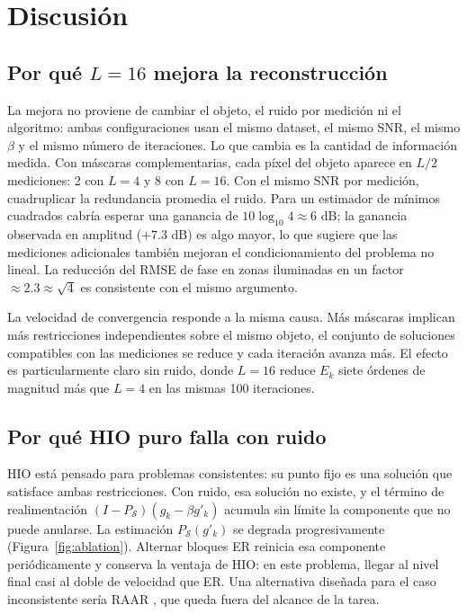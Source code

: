 \documentclass[11pt,a4paper]{article}
\newcommand{\hio}{\textsc{HIO}}
\newcommand{\er}{\textsc{ER}}
\begin{document}
\section{Discusión}

\subsection{Por qué \texorpdfstring{$L=16$}{L=16} mejora la reconstrucción}

La mejora no proviene de cambiar el objeto, el ruido por medición ni el algoritmo: ambas configuraciones usan el mismo dataset, el mismo SNR, el mismo $\beta$ y el mismo número de iteraciones. Lo que cambia es la cantidad de información medida. Con máscaras complementarias, cada píxel del objeto aparece en $L/2$ mediciones: 2 con $L=4$ y 8 con $L=16$. Con el mismo SNR por medición, cuadruplicar la redundancia promedia el ruido. Para un estimador de mínimos cuadrados cabría esperar una ganancia de $10\log_{10}4\approx6$ dB; la ganancia observada en amplitud ($+7.3$ dB) es algo mayor, lo que sugiere que las mediciones adicionales también mejoran el condicionamiento del problema no lineal. La reducción del RMSE de fase en zonas iluminadas en un factor $\approx2.3\approx\sqrt{4}$ es consistente con el mismo argumento.

La velocidad de convergencia responde a la misma causa. Más máscaras implican más restricciones independientes sobre el mismo objeto, el conjunto de soluciones compatibles con las mediciones se reduce y cada iteración avanza más. El efecto es particularmente claro sin ruido, donde $L=16$ reduce $E_k$ siete órdenes de magnitud más que $L=4$ en las mismas 100 iteraciones.

\subsection{Por qué \hio{} puro falla con ruido}

\hio{} está pensado para problemas consistentes: su punto fijo es una solución que satisface ambas restricciones. Con ruido, esa solución no existe, y el término de realimentación $(I-P_\mathcal{S})(g_k-\beta g'_k)$ acumula sin límite la componente que no puede anularse. La estimación $P_\mathcal{S}(g'_k)$ se degrada progresivamente (Figura~\ref{fig:ablation}). Alternar bloques \er{} reinicia esa componente periódicamente y conserva la ventaja de \hio{}: en este problema, llegar al nivel final casi al doble de velocidad que \er{}. Una alternativa diseñada para el caso inconsistente sería RAAR \cite{luke2005raar}, que queda fuera del alcance de la tarea.
\end{document}
